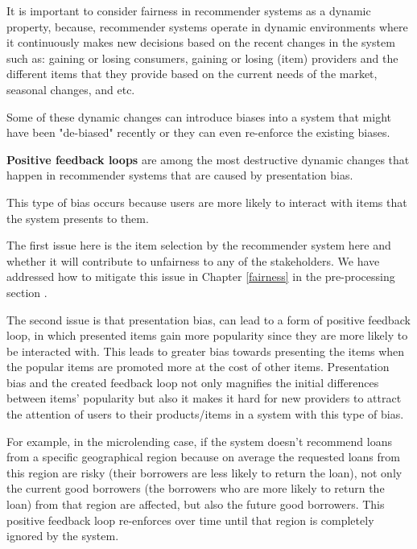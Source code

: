     It is important to consider fairness in recommender systems as a dynamic property, because, recommender systems operate in dynamic environments where it continuously makes new decisions based on the recent changes in the system such as: gaining or losing consumers, gaining or losing (item) providers and the different items that they provide based on the current needs of the market, seasonal changes, and etc.

    Some of these dynamic changes can introduce biases into a system that might have been "de-biased" recently or they can even re-enforce the existing biases. 
    
    \textbf{Positive feedback loops} are among the most destructive dynamic changes that happen in recommender systems \cite{o2016weapons} that are caused by presentation bias.
    
    This type of bias occurs because users are more likely to interact with items that the system presents to them. 
    
    The first issue here is the item selection by the recommender system here and whether it will contribute to unfairness to any of the stakeholders. We have addressed how to mitigate this issue in Chapter \ref{fairness} in the pre-processing section . 
    
    The second issue is that presentation bias, can lead to a form of positive feedback loop, in which presented items gain more popularity since they are more likely to be interacted with. This leads to greater bias towards presenting the items when the popular items are promoted more at the cost of other items. Presentation bias and the created feedback loop not only magnifies the initial differences between items' popularity but also it makes it hard for new providers to attract the attention of users to their products/items in a system with this type of bias.
    
    For example, in the microlending case, if the system doesn't recommend loans from a specific geographical region because on average the requested loans from this region are risky (their borrowers are less likely to return the loan), not only the current good borrowers (the borrowers who are more likely to return the loan) from that region are affected, but also the future good borrowers. This positive feedback loop re-enforces over time until that region is completely ignored by the system.
    
